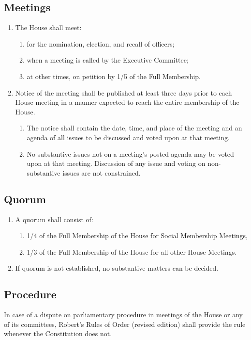 \documentclass[10pt]{article} %
\begin{document}
\subsection{Meetings}
\begin{enumerate}
\item The House shall meet:
\begin{enumerate}
\item for the nomination, election, and recall of officers;
\item when a meeting is called by the Executive Committee;
\item at other times, on petition by 1/5 of the Full Membership.
\end{enumerate}
\item Notice of the meeting shall be published at least three days prior to each House meeting in a manner expected to reach the entire membership of the House.
\begin{enumerate}
\item The notice shall contain the date, time, and place of the meeting and an agenda of all issues to be discussed and voted upon at that meeting.
\item No substantive issues not on a meeting's posted agenda may be voted upon at that meeting. Discussion of any issue and voting on non-substantive issues are not constrained.
\end{enumerate}
\end{enumerate}
\subsection{Quorum}
\label{Quorum}
\begin{enumerate}
\item A quorum shall consist of:
\begin{enumerate}
\item 1/4 of the Full Membership of the House for Social Membership Meetings,
\item 1/3 of the Full Membership of the House for all other House Meetings.
\end{enumerate}
\item If quorum is not established, no substantive matters can be decided.
\end{enumerate}
\subsection{Procedure}
In case of a dispute on parliamentary procedure in meetings of the House or any of its committees, Robert's Rules of Order (revised edition) shall provide the rule whenever the Constitution does not.
\end{document}

